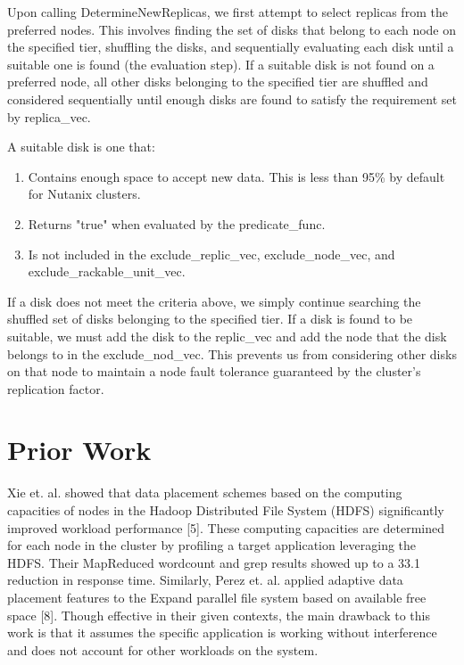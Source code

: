 \documentclass[12pt]{article}
\begin{document}
    Upon calling DetermineNewReplicas, we first attempt to select replicas from
    the preferred nodes. This involves finding the set of disks that belong to
    each node on the specified tier, shuffling the disks, and sequentially
    evaluating each disk until a suitable one is found (the evaluation step).
    If a suitable disk is not found on a preferred node, all other disks
    belonging to the specified tier are shuffled and considered sequentially
    until enough disks are found to satisfy the requirement set by replica\_vec.

    A suitable disk is one that:

    \begin{enumerate}
      \item Contains enough space to accept new data. This is less than 95\% by
            default for Nutanix clusters.  \item Returns "true" when evaluated by the
            predicate\_func.
      \item Is not included in the exclude\_replic\_vec, exclude\_node\_vec,
            and exclude\_rackable\_unit\_vec.
    \end{enumerate}

    If a disk does not meet the criteria above, we simply continue searching
    the shuffled set of disks belonging to the specified tier. If a disk is
    found to be suitable, we must add the disk to the replic\_vec and add the
    node that the disk belongs to in the exclude\_nod\_vec. This prevents us
    from considering other disks on that node to maintain a node fault
    tolerance guaranteed by the cluster's replication factor.


\section{Prior Work}

Xie et. al. showed that data placement schemes based on the computing
capacities of nodes in the Hadoop Distributed File System (HDFS) significantly
improved workload performance [5]. These computing capacities are determined
for each node in the cluster by profiling a target application leveraging the
HDFS. Their MapReduced wordcount and grep results showed up to a 33.1%
reduction in response time. Similarly, Perez et. al. applied adaptive data
placement features to the Expand parallel file system based on available free
space [8]. Though effective in their given contexts, the main drawback to this
work is that it assumes the specific application is working without
interference and does not account for other workloads on the system.
\end{document}
